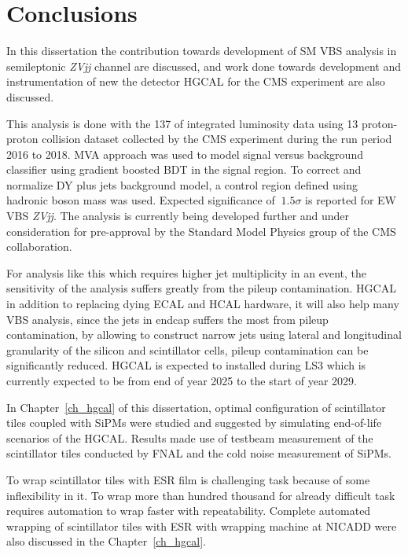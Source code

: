 \chapter{
  Conclusions
 }\label{ch_results}

In this dissertation the contribution towards
development of \gls{SM} \gls{VBS}
analysis in semileptonic \textit{ZVjj} channel are discussed, and work
done towards development and instrumentation of new the detector
\gls{HGCAL} for the \gls{CMS} experiment are also discussed.

This analysis is done with the 137 \fbinv{} of integrated luminosity data
using 13\TeV{} proton-proton collision
dataset collected by the \gls{CMS} experiment during the run period 2016 to 2018.
\gls{MVA} approach was used to
model signal versus background classifier using gradient boosted
\gls{BDT} in the signal region. To correct
and normalize DY plus jets background model, a control region
defined using hadronic boson mass was used.
Expected significance of \( ~1.5\sigma \) is reported for
\gls{EW} \gls{VBS} \textit{ZVjj}.
The analysis is currently being developed further
and under consideration for pre-approval by the Standard Model Physics
group of the \gls{CMS} collaboration.

For analysis like this which requires higher jet multiplicity
in an event, the sensitivity of the analysis suffers
greatly from the pileup contamination.
\gls{HGCAL} in addition to replacing dying \gls{ECAL} and \gls{HCAL}
hardware, it will also help many \gls{VBS} analysis,
since the jets in endcap suffers the most from pileup
contamination, by allowing to construct narrow jets
using lateral and longitudinal granularity of the silicon and scintillator cells,
pileup contamination can be significantly reduced.
\gls{HGCAL} is expected to installed
during \gls{LS3} which is currently expected to be from end of year 2025
to the start of year 2029.

In Chapter~\ref{ch_hgcal} of this dissertation, optimal configuration
of scintillator tiles coupled with \glspl{SiPM}
were studied and suggested by simulating end-of-life scenarios
of the \gls{HGCAL}. Results made use of testbeam measurement of
the scintillator tiles conducted by \gls{FNAL}
and the cold noise measurement of \glspl{SiPM}.

To wrap scintillator tiles with
\gls{ESR} film is challenging task because of some inflexibility
in it. To wrap more than hundred thousand
for already difficult task requires
automation to wrap faster with repeatability.
Complete automated wrapping of scintillator tiles with
\gls{ESR} with wrapping machine at \gls{NICADD} were also discussed
in the Chapter~\ref{ch_hgcal}.